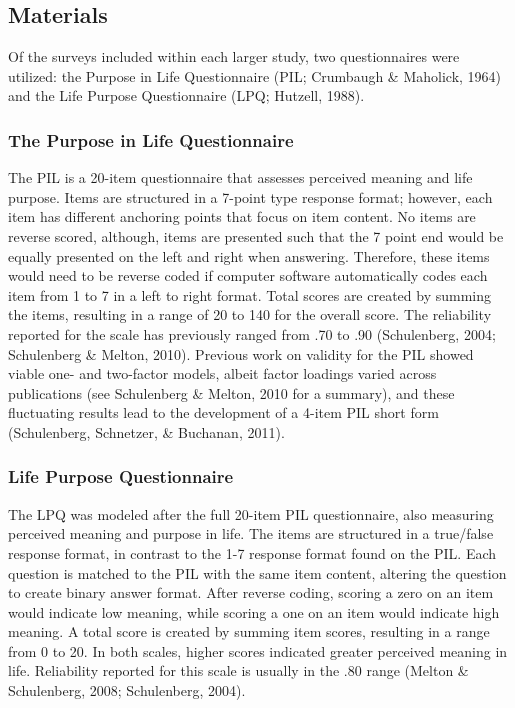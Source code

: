 \documentclass[english,man]{apa6}
\theoremstyle{definition}
\theoremstyle{definition}
\theoremstyle{definition}
\theoremstyle{remark}
\begin{document}
\subsection{Materials}\label{materials}

Of the surveys included within each larger study, two questionnaires
were utilized: the Purpose in Life Questionnaire (PIL; Crumbaugh \&
Maholick, 1964) and the Life Purpose Questionnaire (LPQ; Hutzell, 1988).

\subsubsection{The Purpose in Life
Questionnaire}\label{the-purpose-in-life-questionnaire}

The PIL is a 20-item questionnaire that assesses perceived meaning and
life purpose. Items are structured in a 7-point type response format;
however, each item has different anchoring points that focus on item
content. No items are reverse scored, although, items are presented such
that the 7 point end would be equally presented on the left and right
when answering. Therefore, these items would need to be reverse coded if
computer software automatically codes each item from 1 to 7 in a left to
right format. Total scores are created by summing the items, resulting
in a range of 20 to 140 for the overall score. The reliability reported
for the scale has previously ranged from .70 to .90 (Schulenberg, 2004;
Schulenberg \& Melton, 2010). Previous work on validity for the PIL
showed viable one- and two-factor models, albeit factor loadings varied
across publications (see Schulenberg \& Melton, 2010 for a summary), and
these fluctuating results lead to the development of a 4-item PIL short
form (Schulenberg, Schnetzer, \& Buchanan, 2011).

\subsubsection{Life Purpose
Questionnaire}\label{life-purpose-questionnaire}

The LPQ was modeled after the full 20-item PIL questionnaire, also
measuring perceived meaning and purpose in life. The items are
structured in a true/false response format, in contrast to the 1-7
response format found on the PIL. Each question is matched to the PIL
with the same item content, altering the question to create binary
answer format. After reverse coding, scoring a zero on an item would
indicate low meaning, while scoring a one on an item would indicate high
meaning. A total score is created by summing item scores, resulting in a
range from 0 to 20. In both scales, higher scores indicated greater
perceived meaning in life. Reliability reported for this scale is
usually in the .80 range (Melton \& Schulenberg, 2008; Schulenberg,
2004).
\end{document}
